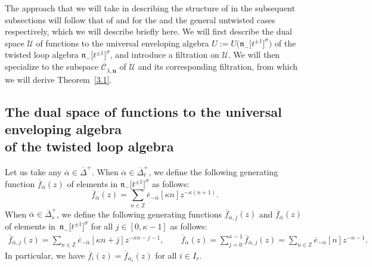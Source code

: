 \documentclass[10pt,a4paper]{amsart}
\numberwithin{equation}{section}
\begin{document}
The approach that we will take in describing the structure of  in the subsequent subsections will follow that of \cite{AKS06} and \cite{AK07} for the  and the general untwisted cases respectively, which we will describe briefly here. We will first describe the dual space $\mathcal{U}$ of functions to the universal enveloping algebra $U:=U\bigl(\mathfrak{n}_-\bigl[t^{\pm1}\bigr]^{\sigma}\bigr)$ of the twisted loop algebra $\mathfrak{n}_-\bigl[t^{\pm1}\bigr]^{\sigma}$, and introduce a filtration on $\mathcal{U}$. We will then specialize to the
subspace $\overline{\mathcal{C}}_{\overline{\lambda}, \mathbf{n}}$ of $\mathcal{U}$ and its corresponding filtration, from which we will derive Theorem~\ref{3.1}.

\subsection[The dual space of functions to the universal enveloping algebra of the twisted loop algebra]{The dual space of functions to the universal enveloping algebra\\ of the twisted loop algebra}\label{Section 3.2}

Let us take any $\overline{\alpha}\in\overline{\Delta}^+$. When $\overline{\alpha}\in\overline{\Delta}_{\ell}^+$, we define the following generating function $\overline{f}_{\overline{\alpha}}(z)$ of elements in $\mathfrak{n}_-\bigl[t^{\pm1}\bigr]^{\sigma}$ as follows:
\begin{equation*}
\overline{f}_{\overline{\alpha}}(z)=
\sum_{n\in\mathbb{Z}}\overline{e}_{-\overline{\alpha}}[\kappa n]z^{-\kappa(n+1)}.
\end{equation*}
When $\overline{\alpha}\in\overline{\Delta}_s^+$, we define the following generating functions $\overline{f}_{\overline{\alpha},j}(z)$ and $\overline{f}_{\overline{\alpha}}(z)$ of elements in~$\mathfrak{n}_-\bigl[t^{\pm1}\bigr]^{\sigma}$ for all $j\in[0,\kappa-1]$ as follows:{\samepage
\begin{align*}
\overline{f}_{\overline{\alpha},j}(z)
=\sum_{n\in\mathbb{Z}}\overline{e}_{-\overline{\alpha}}[\kappa n+j]z^{-\kappa n-j-1},\qquad
\overline{f}_{\overline{\alpha}}(z)
=\sum_{j=0}^{\kappa-1}\overline{f}_{\overline{\alpha},j}(z)=\sum_{n\in\mathbb{Z}}\overline{e}_{-\overline{\alpha}}[n]z^{-n-1}.
\end{align*}
In particular, we have $\overline{f}_i(z)= \overline{f}_{\overline{\alpha}_i}(z)$ for all $i\in I_r$.}
\end{document}
